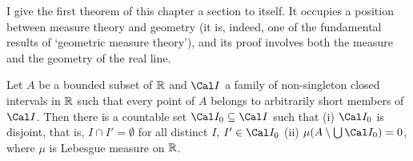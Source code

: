 
\def\chaptername{The Fundamental Theorem of Calculus}
\def\sectionname{Vitali's theorem in $\Bbb R$}

\def\headlinesectionname{Vitali's theorem in $\eightBbb R$}

I give the first theorem of this chapter a section to itself.   It
occupies a position between measure theory and geometry (it is,
indeed, one of the fundamental results of `geometric measure
theory'), and its proof involves both the measure and the geometry of
the real line.

 Let $A$ be a bounded subset of $\Bbb R$
and $\Cal I$ a family of non-singleton closed
intervals in $\Bbb R$ such that every point of
$A$ belongs to arbitrarily short members of $\Cal I$.   Then there is a
countable set $\Cal I_0\subseteq\Cal I$ such that (i) $\Cal I_0$ is
disjoint, that is,
$I\cap I'=\emptyset$ for all distinct $I$, $I'\in\Cal I_0$ (ii)
$\mu(A\setminus\bigcup\Cal I_0)=0$, where $\mu$ is Lebesgue measure on
$\Bbb R$.


